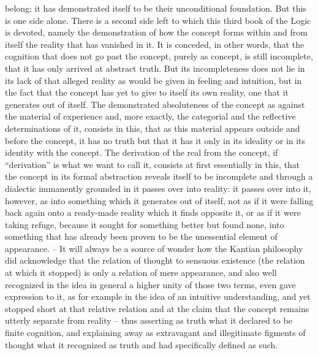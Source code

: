 belong; it has demonstrated itself to be their unconditional foundation. But
this is one side alone. There is a second side left to which this third book of
the Logic is devoted, namely the demonstration of how the concept forms
within and from itself the reality that has vanished in it. It is conceded, in
other words, that the cognition that does not go past the concept, purely
as concept, is still incomplete, that it has only arrived at abstract truth. But
its incompleteness does not lie in its lack of that alleged reality as would be
given in feeling and intuition, but in the fact that the concept has yet to give
to itself its own reality, one that it generates out of itself. The demonstrated
absoluteness of the concept as against the material of experience and, more
exactly, the categorial and the reflective determinations of it, consists in
this, that as this material appears outside and before the concept, it has no
truth but that it has it only in its ideality or in its identity with the concept.
The derivation of the real from the concept, if “derivation” is what we
want to call it, consists at first essentially in this, that the concept in its
formal abstraction reveals itself to be incomplete and through a dialectic
immanently grounded in it passes over into reality: it passes over into it,
however, as into something which it generates out of itself, not as if it
were falling back again onto a ready-made reality which it finds opposite
it, or as if it were taking refuge, because it sought for something better
but found none, into something that has already been proven to be the
unessential element of appearance. – It will always be a source of wonder
how the Kantian philosophy did acknowledge that the relation of thought
to sensuous existence (the relation at which it stopped) is only a relation of
mere appearance, and also well recognized in the idea in general a higher
unity of those two terms, even gave expression to it, as for example in the
idea of an intuitive understanding, and yet stopped short at that relative
relation and at the claim that the concept remains utterly separate from
reality – thus asserting as truth what it declared to be finite cognition, and
explaining away as extravagant and illegitimate figments of thought what
it recognized as truth and had specifically defined as such.

